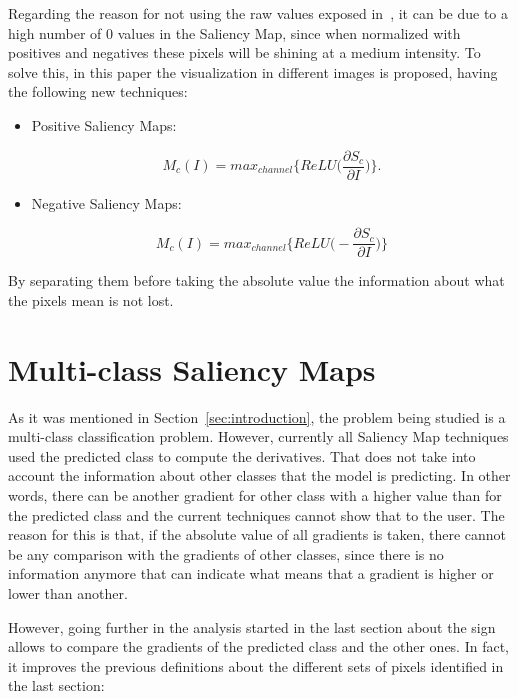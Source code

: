 \documentclass[preprint,12pt]{elsarticle}
\begin{document}
Regarding the reason for not using the raw values exposed in~\cite{smilkovSmoothGradRemovingNoise}, it can be due to a high number of 0 values in the Saliency Map, since when normalized with positives and negatives these pixels will be shining at a medium intensity. To solve this, in this paper the visualization in different images is proposed, having the following new techniques:

\begin{itemize}
    \item Positive Saliency Maps:
    
    \begin{equation}
        \label{eq: positive saliency map}
        M_c(I) = max_{channel}\bigg \{ ReLU \bigg (\frac{\partial S_c}{\partial I} \bigg ) \bigg \}.
    \end{equation}

    \item Negative Saliency Maps:
    
    \begin{equation}
        \label{eq: negative saliency map}
        M_c(I) = max_{channel}\bigg \{ ReLU \bigg (-\frac{\partial S_c}{\partial I} \bigg ) \bigg \}
    \end{equation}

\end{itemize}

By separating them before taking the absolute value the information about what the pixels mean is not lost. 

\section{Multi-class Saliency Maps}
\label{sec:multi-class saliency map}
As it was mentioned in Section~\ref{sec:introduction}, the problem being studied is a multi-class classification problem. However, currently all Saliency Map techniques used the predicted class to compute the derivatives. That does not take into account the information about other classes that the model is predicting. In other words, there can be another gradient for other class with a higher value than for the predicted class and the current techniques cannot show that to the user. The reason for this is that, if the absolute value of all gradients is taken, there cannot be any comparison with the gradients of other classes, since there is no information anymore that can indicate what means that a gradient is higher or lower than another.

However, going further in the analysis started in the last section about the sign allows to compare the gradients of the predicted class and the other ones. In fact, it improves the previous definitions about the different sets of pixels identified in the last section:
\end{document}
